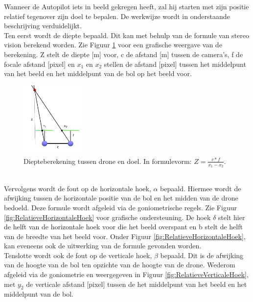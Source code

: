 \noindent
Wanneer de Autopilot iets in beeld gekregen heeft, zal hij starten met zijn positie relatief tegenover zijn doel te bepalen. De werkwijze wordt in onderstaande beschrijving verduidelijkt.
\\
Ten eerst wordt de diepte bepaald. Dit kan met behulp van de formule van stereo vision \cite{website:techbriefs} berekend worden.
Zie Figuur \ref{fig:DiepteberekeningDroneEnDoel} voor een grafische weergave van de berekening. Z stelt de diepte [m] voor, c de afstand [m] tussen de camera's, f de focale afstand [pixel] en $x_1$ en $x_2$ stellen de afstand [pixel] tussen het middelpunt van het beeld en het middelpunt van de bol op het beeld voor.
\begin{figure}[h]
	\centering
	\includegraphics[width=0.3\textwidth]{DiepteberekeningDroneEnDoel.png}
	\caption{Diepteberekening tussen drone en doel. In formulevorm: \(Z = \frac{c * f}{x_1 - x_2}\).}
	\label{fig:DiepteberekeningDroneEnDoel}
\end{figure}
\\
Vervolgens wordt de fout op de horizontale hoek, $\alpha$ bepaald. Hiermee wordt de afwijking tussen de horizontale positie van de bol en het midden van de drone bedoeld. Deze formule wordt afgeleid via de goniometrische regels. Zie Figuur \ref{fig:RelatieveHorizontaleHoek} voor grafische ondersteuning. De hoek $\delta$ stelt hier de helft van de horizontale hoek voor die het beeld overspant en b stelt de helft van de breedte van het beeld voor. Onder Figuur \ref{fig:RelatieveHorizontaleHoek}, kan eveneens ook de uitwerking van de formule gevonden worden.
\\
Tenslotte wordt ook de fout op de verticale hoek, $\beta$ bepaald. Dit is de afwijking van de hoogte van de bol ten opzichte van de hoogte van de drone. Wederom afgeleid via de goniometrie en weergegeven in Figuur \ref{fig:RelatieveVerticaleHoek}, met $y_2$ de verticale afstand [pixel] tussen de het middelpunt van het beeld en het middelpunt van de bol.
